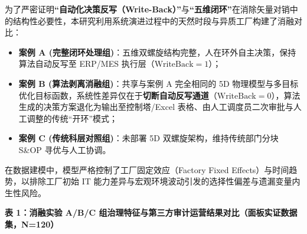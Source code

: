 \documentclass[
]{article}
\providecommand{\tightlist}{%
  \setlength{\itemsep}{0pt}\setlength{\parskip}{0pt}}
\begin{document}
为了严密证明\textbf{``自动化决策反写（Write-Back）''}与\textbf{``五维闭环''}在消除矢量对销中的结构性必要性，本研究利用系统演进过程中的天然时段与异质工厂构建了消融对比：

\begin{itemize}
\tightlist
\item
  \textbf{案例 A
  (完整闭环处理组)}：五维双螺旋结构完整，人在环外自主决策，保持算法自动反写至
  ERP/MES 执行层（\(\text{WriteBack} = 1\)）；
\item
  \textbf{案例 B (算法剥离消融组)}：共享与案例 A 完全相同的 5D
  物理模型与多目标优化目标函数，系统性差异仅在于\textbf{切断自动反写通道}（\(\text{WriteBack} = 0\)），算法生成的决策方案退化为输出至控制塔/Excel
  表格、由人工调度员二次审批与人工调整的传统``开环''模式；
\item
  \textbf{案例 C (传统科层对照组)}：未部署 5D
  双螺旋架构，维持传统部门分块 S\&OP 寻优与人工协调。
\end{itemize}

在数据建模中，模型严格控制了工厂固定效应（Factory Fixed
Effects）与时间趋势，以排除工厂初始 IT
能力差异与宏观环境波动引发的选择性偏差与遗漏变量内生性风险。

\textbf{表 1：消融实验 A/B/C
组治理特征与第三方审计运营结果对比（面板实证数据集，N=120）}
\end{document}

